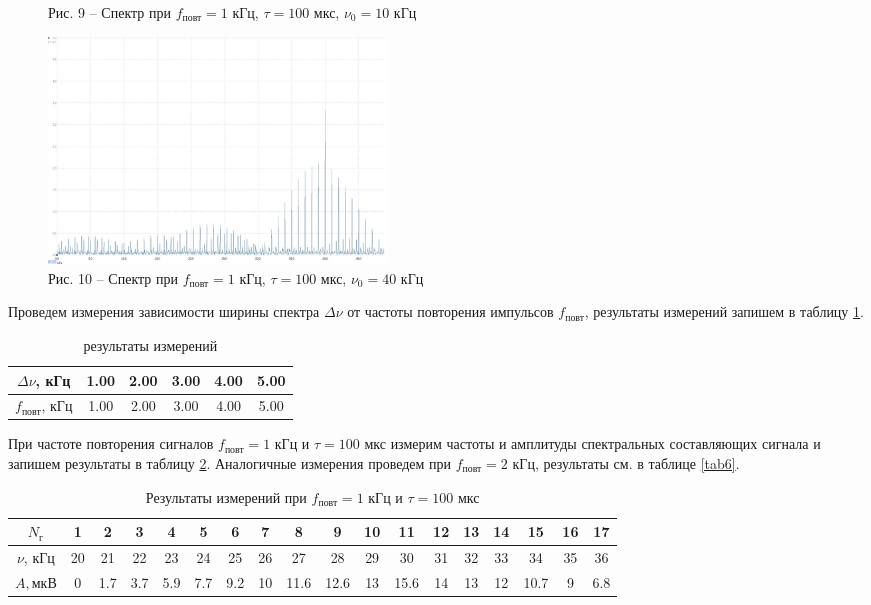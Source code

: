 \documentclass[a4paper,14pt]{article}
\begin{document}
\begin{figure}[!h]
{		Рис. 9 -- Спектр при $f_{\text{повт}} = 1$ кГц, $\tau = 100$ мкс, $\nu_0 = 10$ кГц}
	\parbox[!h]{0.5\textwidth}{\null
		\centering
		\includegraphics[width = 9cm]{10.jpeg} \\
		Рис. 10 -- Спектр при $f_{\text{повт}} = 1$ кГц, $\tau = 100$ мкс, $\nu_0 = 40$ кГц}
\end{figure}


Проведем измерения зависимости ширины спектра $\Delta \nu$ от частоты повторения импульсов $f_{\text{повт}}$, результаты измерений запишем в таблицу \ref{tab4}.

\begin{table}[hbt!]
	\begin{center}
	\begin{tabular}{|c|c|c|c|c|c|} \hline
		$\Delta \nu$, кГц	& 1.00 & 2.00 & 3.00 & 4.00 & 5.00\\ \hline
		$f_{\text{повт}}$, кГц & 1.00 & 2.00 & 3.00 & 4.00 & 5.00 \\ \hline
	\end{tabular}
\caption{результаты измерений}
\label{tab4}
\end{center}
\end{table}

При частоте повторения сигналов $f_\text{повт} = 1$ кГц  и $\tau = 100$ мкс измерим частоты и амплитуды спектральных составляющих сигнала и запишем результаты в таблицу \ref{tab5}. Аналогичные измерения проведем при $f_\text{повт} = 2$ кГц, результаты см. в таблице \ref{tab6}. 

\begin{table}[hbt!]
	\begin{center}
	\begin{tabular}{|c|c|c|c|c|c|c|c|c|c|c|c|c|c|c|c|c|c|} \hline
		$N_{\text{г}}$ &1&	2&	3&4&	5&	6&	7&8&	9&	10&	11&	12	&13	&14&	15	&16&	17\\ \hline
		$\nu$, кГц	&20	&21&	22&	23&	24&	25&	26&	27&	28&	29&	30&	31&	32&	33&	34&	35&	36\\ \hline
		$A, \text{мкВ}$&	0	&1.7&	3.7&	5.9&	7.7&	9.2&	10&	11.6&	12.6	&13&	15.6&	14&	13&	12&	10.7&	9&	6.8	 \\ \hline
	\end{tabular}
	\caption{Результаты измерений при $f_\text{повт} = 1$ кГц  и $\tau = 100$ мкс}
	\label{tab5}
\end{center}
\end{table}
\end{document}
